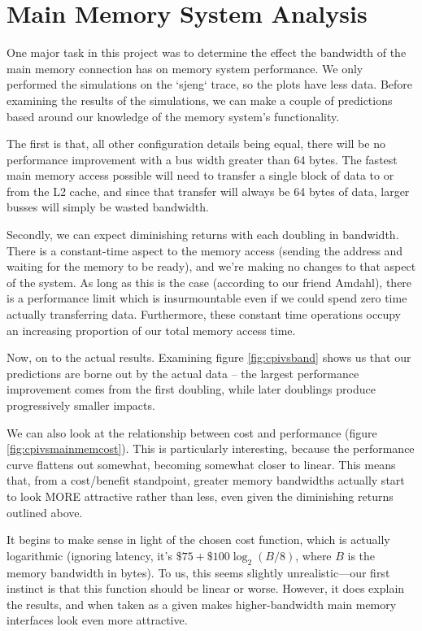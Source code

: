 \documentclass{article}
\begin{document}
\section{Main Memory System Analysis}

One major task in this project was to determine the effect the bandwidth of the
main memory connection has on memory system performance. We only performed the
simulations on the `sjeng` trace, so the plots have less data. Before examining
the results of the simulations, we can make a couple of predictions based around
our knowledge of the memory system's functionality.

The first is that, all other configuration details being equal, there will be no
performance improvement with a bus width greater than 64 bytes. The fastest main
memory access possible will need to transfer a single block of data to or from
the L2 cache, and since that transfer will always be 64 bytes of data, larger
busses will simply be wasted bandwidth.

Secondly, we can expect diminishing returns with each doubling in bandwidth.
There is a constant-time aspect to the memory access (sending the address and
waiting for the memory to be ready), and we're making no changes to that aspect
of the system. As long as this is the case (according to our friend Amdahl),
there is a performance limit which is insurmountable even if we could spend zero
time actually transferring data. Furthermore, these constant time operations
occupy an increasing proportion of our total memory access time.

Now, on to the actual results. Examining figure \ref{fig:cpivsband} shows us
that our predictions are borne out by the actual data -- the largest performance
improvement comes from the first doubling, while later doublings produce
progressively smaller impacts.

We can also look at the relationship between cost and performance (figure
\ref{fig:cpivsmainmemcost}). This is particularly interesting, because the
performance curve flattens out somewhat, becoming somewhat closer to linear.
This means that, from a cost/benefit standpoint, greater memory bandwidths
actually start to look MORE attractive rather than less, even given the
diminishing returns outlined above.

It begins to make sense in light of the chosen cost function, which is actually
logarithmic (ignoring latency, it's $\$75 + \$100 \log_2(B / 8)$, where $B$ is
the memory bandwidth in bytes). To us, this seems slightly unrealistic---our
first instinct is that this function should be linear or worse. However, it does
explain the results, and when taken as a given makes higher-bandwidth main
memory interfaces look even more attractive.
\end{document}
